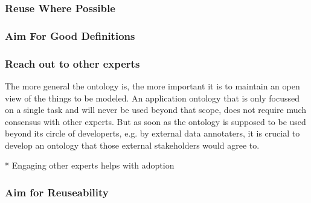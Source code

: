 \subsubsection{Reuse Where Possible}

\subsubsection{Aim For Good Definitions}

\subsubsection{Reach out to other experts}

The more general the ontology is, the more important it is to maintain an open view of the things to be modeled. An application ontology that is only focussed on a single task and will never be used beyond that scope, does not require much consensus with other experts. But as soon as the ontology is supposed to be used beyond its circle of developerts, e.g. by external data annotaters, it is crucial to develop an ontology that those external stakeholders would agree to.

* Engaging other experts helps with adoption


\subsubsection{Aim for Reuseability}

